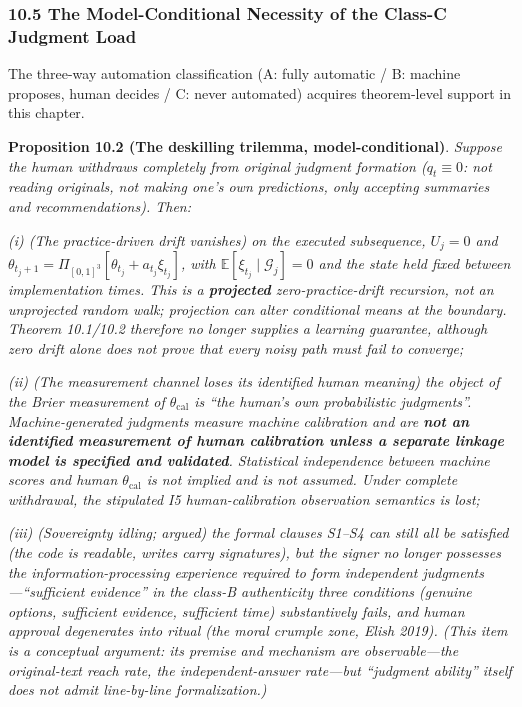 \documentclass[
  11pt]{article}
\begin{document}
\subsubsection{10.5 The Model-Conditional Necessity of the Class-C
Judgment
Load}\label{the-model-conditional-necessity-of-the-class-c-judgment-load}

The three-way automation classification (A: fully automatic / B: machine
proposes, human decides / C: never automated) acquires theorem-level
support in this chapter.

\textbf{Proposition 10.2 (The deskilling trilemma, model-conditional)}.
\emph{Suppose the human withdraws completely from original judgment
formation (\(q_t \equiv 0\): not reading originals, not making one's own
predictions, only accepting summaries and recommendations). Then:}

\emph{(i) (The practice-driven drift vanishes) on the executed
subsequence, \(U_j=0\) and
\(\theta_{t_j+1}=\Pi_{[0,1]^3}[\theta_{t_j}+a_{t_j}\xi_{t_j}]\), with
\(\mathbb E[\xi_{t_j}\mid\mathcal G_j]=0\) and the state held fixed
between implementation times. This is a \textbf{projected}
zero-practice-drift recursion, not an unprojected random walk;
projection can alter conditional means at the boundary. Theorem
10.1/10.2 therefore no longer supplies a learning guarantee, although
zero drift alone does not prove that every noisy path must fail to
converge;}

\emph{(ii) (The measurement channel loses its identified human meaning)
the object of the Brier measurement of \(\theta_{\mathrm{cal}}\) is
``the human's own probabilistic judgments''. Machine-generated judgments
measure machine calibration and are \textbf{not an identified
measurement of human calibration unless a separate linkage model is
specified and validated}. Statistical independence between machine
scores and human \(\theta_{\mathrm{cal}}\) is not implied and is not
assumed. Under complete withdrawal, the stipulated I5 human-calibration
observation semantics is lost;}

\emph{(iii) (Sovereignty idling; argued) the formal clauses S1--S4 can
still all be satisfied (the code is readable, writes carry signatures),
but the signer no longer possesses the information-processing experience
required to form independent judgments---``sufficient evidence'' in the
class-B authenticity three conditions (genuine options, sufficient
evidence, sufficient time) substantively fails, and human approval
degenerates into ritual (the moral crumple zone, Elish 2019). (This item
is a conceptual argument: its premise and mechanism are observable---the
original-text reach rate, the independent-answer rate---but ``judgment
ability'' itself does not admit line-by-line formalization.)}
\end{document}
